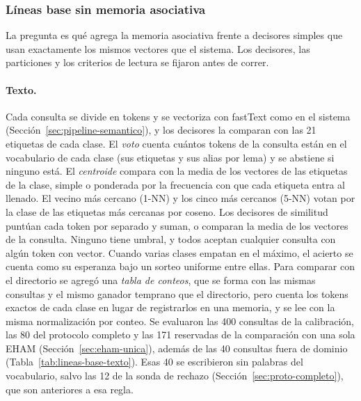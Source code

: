 \subsubsection{Líneas base sin memoria asociativa}
\label{sec:lineas-base}

La pregunta es qué agrega la memoria asociativa frente a decisores simples que usan
exactamente los mismos vectores que el sistema.
Los decisores, las particiones y los criterios de lectura se fijaron antes de correr.

\paragraph{Texto.}
Cada consulta se divide en tokens y se vectoriza con fastText como en el sistema
(Sección~\ref{sec:pipeline-semantico}), y los decisores la comparan con las 21
etiquetas de cada clase.
El \emph{voto} cuenta cuántos tokens de la consulta están en el vocabulario de cada
clase (sus etiquetas y sus alias por lema) y se abstiene si ninguno está.
El \emph{centroide} compara con la media de los vectores de las etiquetas de la clase,
simple o ponderada por la frecuencia con que cada etiqueta entra al llenado.
El vecino más cercano (1-NN) y los cinco más cercanos (5-NN) votan por la clase de las
etiquetas más cercanas por coseno.
Los decisores de similitud puntúan cada token por separado y suman, o comparan la media
de los vectores de la consulta.
Ninguno tiene umbral, y todos aceptan cualquier consulta con algún token con vector.
Cuando varias clases empatan en el máximo, el acierto se cuenta como su esperanza bajo
un sorteo uniforme entre ellas.
Para comparar con el directorio se agregó una \emph{tabla de conteos}, que se forma con
las mismas consultas y el mismo ganador temprano que el directorio, pero cuenta los
tokens exactos de cada clase en lugar de registrarlos en una memoria, y se lee con la
misma normalización por conteo.
Se evaluaron las 400 consultas de la calibración, las 80 del protocolo completo y las
171 reservadas de la comparación con una sola EHAM (Sección~\ref{sec:eham-unica}),
además de las 40 consultas fuera de dominio (Tabla~\ref{tab:lineas-base-texto}).
Esas 40 se escribieron sin palabras del vocabulario, salvo las 12 de la sonda de rechazo
(Sección~\ref{sec:proto-completo}), que son anteriores a esa regla.


